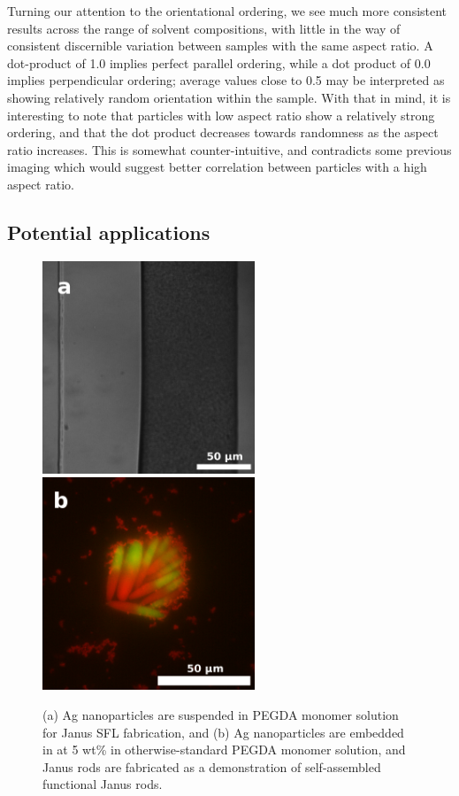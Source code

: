Turning our attention to the orientational ordering, we see much more consistent results across the
range of solvent compositions, with little in the way of consistent discernible variation between samples with
the same aspect ratio.  A dot-product of 1.0 implies perfect parallel ordering, while a dot product of 0.0 implies
perpendicular ordering; average values close to 0.5 may be interpreted as showing relatively random orientation
within the sample.  With that in mind, it is interesting to note that particles with low aspect ratio show 
a relatively strong ordering, and that the dot product decreases towards randomness as the aspect ratio 
increases.  This is somewhat counter-intuitive, and contradicts some previous imaging which would suggest
better correlation between particles with a high aspect ratio.

\subsection{Potential applications}

\begin{figure}
\begin{center}

\includegraphics[height=2.5in]{figures/rods/silver-microchannel-twostream.png}
\includegraphics[height=2.5in]{figures/rods/silver-fluorescence-assembly.png}
\end{center}
\caption{
(a) Ag nanoparticles are suspended in PEGDA monomer solution for Janus SFL fabrication, and
(b) Ag nanoparticles are embedded in at 5 wt\% in otherwise-standard PEGDA monomer solution, and Janus rods
are fabricated as a demonstration of self-assembled functional Janus rods.}
\label{fig:silver-janus}
\end{figure}

